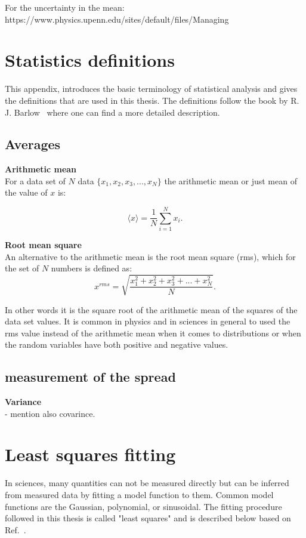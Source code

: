 For the uncertainty in the mean:
https://www.physics.upenn.edu/sites/default/files/Managing%

\section{Statistics definitions}\label{app:statistics_definitions}
This appendix, introduces the basic terminology of statistical analysis and gives the definitions that are used in this thesis. The definitions follow the book by R. J. Barlow~\cite{lvp.b313005720130101} where one can find a more detailed description.

\subsection{Averages}
\normalsize{\textbf{Arithmetic mean}}\\
For a data set of $N$ data $\{ x_1, x_2, x_3, ..., x_N \}$ the arithmetic mean or just mean of the value of $x$ is:

\begin{equation}\label{eq:mean_def}
    \langle x \rangle = \frac{1}{N} \sum_{i=1}^{N} x_i.
\end{equation}

\normalsize{\textbf{Root mean square}}\\
An alternative to the arithmetic mean is the root mean square (rms), which for the set of $N$ numbers is defined as:
\begin{equation}\label{eq:mean_def}
    x^{rms} = \sqrt{\frac{x_1^2+x_2^2+x_3^2+...+x_N^2}{N}}.
\end{equation}

In other words it is the square root of the arithmetic mean of the squares of the data set values. It is common in physics and in sciences in general to used the rms value instead of the arithmetic mean when it comes to distributions or when the random variables have both positive and negative values.

\subsection{measurement of the spread}
\normalsize{\textbf{Variance}}\\


- mention also covarince.



\section{Least squares fitting}\label{app:non_linear_fitting}
In sciences, many quantities can not be measured directly but can be inferred from measured data by fitting a model function to them. Common model functions are the Gaussian, polynomial, or sinusoidal. The fitting procedure followed in this thesis is called "least squares" and is described below based on Ref.~\cite{least_square_minimisation}.

